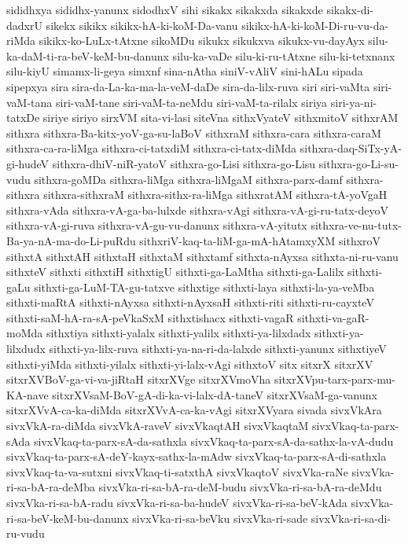 {sididhxya
sididhx-yanunx
sidodhxV
sihi
sikakx
sikakxda
sikakxde
sikakx-di-dadxrU
sikekx
sikikx
sikikx-hA-ki-koM-Da-vanu
sikikx-hA-ki-koM-Di-ru-vu-da-riMda
sikikx-ko-LuLx-tAtxne
sikoMDu
sikukx
sikukxva
sikukx-vu-dayAyx
silu-ka-daM-ti-ra-beV-keM-bu-danunx
silu-ka-vaDe
silu-ki-ru-tAtxne
silu-ki-tetxnanx
silu-kiyU
simamx-li-geya
simxnf
sina-nAtha
siniV-vAliV
sini-hALu
sipada
sipepxya
sira
sira-da-La-ka-ma-la-veM-daDe
sira-da-lilx-ruva
siri
siri-vaMta
siri-vaM-tana
siri-vaM-tane
siri-vaM-ta-neMdu
siri-vaM-ta-rilalx
siriya
siri-ya-ni-tatxDe
siriye
siriyo
sirxVM
sita-vi-lasi
siteVna
sithxVyateV
sithxmitoV
sithxrAM
sithxra
sithxra-Ba-kitx-yoV-ga-su-laBoV
sithxraM
sithxra-cara
sithxra-caraM
sithxra-ca-ra-liMga
sithxra-ci-tatxdiM
sithxra-ci-tatx-diMda
sithxra-daq-SiTx-yA-gi-hudeV
sithxra-dhiV-niR-yatoV
sithxra-go-Lisi
sithxra-go-Lisu
sithxra-go-Li-su-vudu
sithxra-goMDa
sithxra-liMga
sithxra-liMgaM
sithxra-parx-damf
sithxra-sithxra
sithxra-sithxraM
sithxra-sithx-ra-liMga
sithxratAM
sithxra-tA-yoVgaH
sithxra-vAda
sithxra-vA-ga-ba-lulxde
sithxra-vAgi
sithxra-vA-gi-ru-tatx-deyoV
sithxra-vA-gi-ruva
sithxra-vA-gu-vu-danunx
sithxra-vA-yitutx
sithxra-ve-nu-tutx-Ba-ya-nA-ma-do-Li-puRdu
sithxriV-kaq-ta-liM-ga-mA-hAtamxyXM
sithxroV
sithxtA
sithxtAH
sithxtaH
sithxtaM
sithxtamf
sithxta-nAyxsa
sithxta-ni-ru-vanu
sithxteV
sithxti
sithxtiH
sithxtigU
sithxti-ga-LaMtha
sithxti-ga-Lalilx
sithxti-gaLu
sithxti-ga-LuM-TA-gu-tatxve
sithxtige
sithxti-laya
sithxti-la-ya-veMba
sithxti-maRtA
sithxti-nAyxsa
sithxti-nAyxsaH
sithxti-riti
sithxti-ru-cayxteV
sithxti-saM-hA-ra-sA-peVkaSxM
sithxtishacx
sithxti-vagaR
sithxti-va-gaR-moMda
sithxtiya
sithxti-yalalx
sithxti-yalilx
sithxti-ya-lilxdadx
sithxti-ya-lilxdudx
sithxti-ya-lilx-ruva
sithxti-ya-na-ri-da-lalxde
sithxti-yanunx
sithxtiyeV
sithxti-yiMda
sithxti-yilalx
sithxti-yi-lalx-vAgi
sithxtoV
sitx
sitxrX
sitxrXV
sitxrXVBoV-ga-vi-va-jiRtaH
sitxrXVge
sitxrXVmoVha
sitxrXVpu-tarx-parx-mu-KA-nave
sitxrXVsaM-BoV-gA-di-ka-vi-lalx-dA-taneV
sitxrXVsaM-ga-vanunx
sitxrXVvA-ca-ka-diMda
sitxrXVvA-ca-ka-vAgi
sitxrXVyara
sivada
sivxVkAra
sivxVkA-ra-diMda
sivxVkA-raveV
sivxVkaqtAH
sivxVkaqtaM
sivxVkaq-ta-parx-sAda
sivxVkaq-ta-parx-sA-da-sathxla
sivxVkaq-ta-parx-sA-da-sathx-la-vA-dudu
sivxVkaq-ta-parx-sA-deY-kayx-sathx-la-mAdw
sivxVkaq-ta-parx-sA-di-sathxla
sivxVkaq-ta-va-sutxni
sivxVkaq-ti-satxthA
sivxVkaqtoV
sivxVka-raNe
sivxVka-ri-sa-bA-ra-deMba
sivxVka-ri-sa-bA-ra-deM-budu
sivxVka-ri-sa-bA-ra-deMdu
sivxVka-ri-sa-bA-radu
sivxVka-ri-sa-ba-hudeV
sivxVka-ri-sa-beV-kAda
sivxVka-ri-sa-beV-keM-bu-danunx
sivxVka-ri-sa-beVku
sivxVka-ri-sade
sivxVka-ri-sa-di-ru-vudu
}
